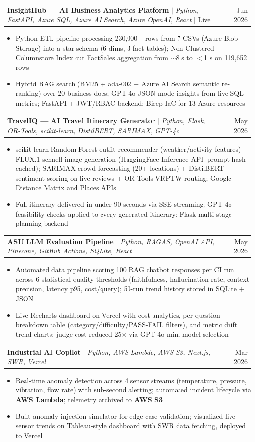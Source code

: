\documentclass[letterpaper,10pt]{article}
\makeatletter
\newcommand{\resumeItem}[1]{\item\small{#1\vspace{-2pt}}}
\newcommand{\resumeProject}[2]{
  \item
  \begin{tabular*}{0.97\textwidth}{l@{\extracolsep{\fill}}r}
    \small#1 & \small#2 \\
  \end{tabular*}\vspace{-6pt}
}
\newcommand{\resumeIL}{\begin{itemize}[leftmargin=0.18in,topsep=1pt,itemsep=0pt]}
\newcommand{\resumeILE}{\end{itemize}\vspace{-3pt}}
\makeatother
\begin{document}
  \resumeProject
    {\textbf{InsightHub --- AI Business Analytics Platform} $|$ \emph{Python, FastAPI, Azure SQL, Azure AI Search, Azure OpenAI, React} $|$ \href{https://insighthub-five.vercel.app}{\underline{Live}}}{Jun 2026}
    \resumeIL
      \resumeItem{Python ETL pipeline processing 230,000+ rows from 7 CSVs (Azure Blob Storage) into a star schema (6 dims, 3 fact tables); Non-Clustered Columnstore Index cut FactSales aggregation from $\sim$8 s to $<$1 s on 119,652 rows}
      \resumeItem{Hybrid RAG search (BM25 + ada-002 + Azure AI Search semantic re-ranking) over 20 business docs; GPT-4o JSON-mode insights from live SQL metrics; FastAPI + JWT/RBAC backend; Bicep IaC for 13 Azure resources}
    \resumeILE

  \resumeProject
    {\textbf{TravelIQ --- AI Travel Itinerary Generator} $|$ \emph{Python, Flask, OR-Tools, scikit-learn, DistilBERT, SARIMAX, GPT-4o}}{May 2026}
    \resumeIL
      \resumeItem{scikit-learn Random Forest outfit recommender (weather/activity features) + FLUX.1-schnell image generation (HuggingFace Inference API, prompt-hash cached); SARIMAX crowd forecasting (20+ locations) + DistilBERT sentiment scoring on live reviews + OR-Tools VRPTW routing; Google Distance Matrix and Places APIs}
      \resumeItem{Full itinerary delivered in under 90 seconds via SSE streaming; GPT-4o feasibility checks applied to every generated itinerary; Flask multi-stage planning backend}
    \resumeILE

  \resumeProject
    {\textbf{ASU LLM Evaluation Pipeline} $|$ \emph{Python, RAGAS, OpenAI API, Pinecone, GitHub Actions, SQLite, React}}{May 2026}
    \resumeIL
      \resumeItem{Automated data pipeline scoring 100 RAG chatbot responses per CI run across 6 statistical quality thresholds (faithfulness, hallucination rate, context precision, latency p95, cost/query); 50-run trend history stored in SQLite + JSON}
      \resumeItem{Live Recharts dashboard on Vercel with cost analytics, per-question breakdown table (category/difficulty/PASS-FAIL filters), and metric drift trend charts; judge cost reduced 25$\times$ via GPT-4o-mini model selection}
    \resumeILE

  \resumeProject
    {\textbf{Industrial AI Copilot} $|$ \emph{Python, AWS Lambda, AWS S3, Next.js, SWR, Vercel}}{Mar 2026}
    \resumeIL
      \resumeItem{Real-time anomaly detection across 4 sensor streams (temperature, pressure, vibration, flow rate) with sub-second alerting; automated incident lifecycle via \textbf{AWS Lambda}; telemetry archived to \textbf{AWS S3}}
      \resumeItem{Built anomaly injection simulator for edge-case validation; visualized live sensor trends on Tableau-style dashboard with SWR data fetching, deployed to Vercel}
    \resumeILE
\end{document}
